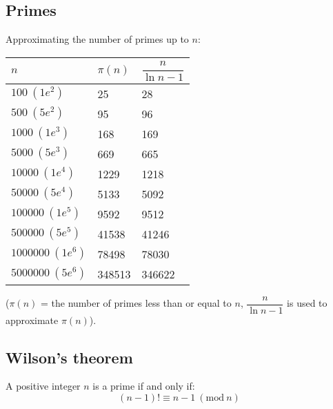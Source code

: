 \subsection{Primes}
Approximating the number of primes up to $n$: 
\begin{center}
	\begin{tabular}{| l | l | l | }
		\hline
		$n$ & $\pi(n)$ & $\dfrac{n}{\ln{n} - 1}$ \\
		\hline

		$100\ (1e^2)$ & 25 & 28 \\ 
		$500\ (5e^2)$ & 95 & 96 \\ 
		$1000\ (1e^3)$ & 168 & 169 \\ 
		$5000\ (5e^3)$ & 669 & 665 \\ 
		$10000\ (1e^4)$ & 1229 & 1218 \\ 
		$50000\ (5e^4)$ & 5133 & 5092 \\ 
		$100000\ (1e^5)$ & 9592 & 9512 \\ 
		$500000\ (5e^5)$ & 41538 & 41246 \\ 
		$1000000\ (1e^6)$ & 78498 & 78030 \\ 
		$5000000\ (5e^6)$ & 348513 & 346622 \\ 
		\hline
	\end{tabular}
\end{center}
($\pi(n)$ = the number of primes less than or equal to $n$, $\dfrac{n}{\ln{n} - 1}$ is used to approximate $\pi(n)$).

\subsection{Wilson's theorem}
A positive integer $n$ is a prime if and only if:
\[ (n - 1)! \equiv n - 1\ (\text{mod}\ n)\]

